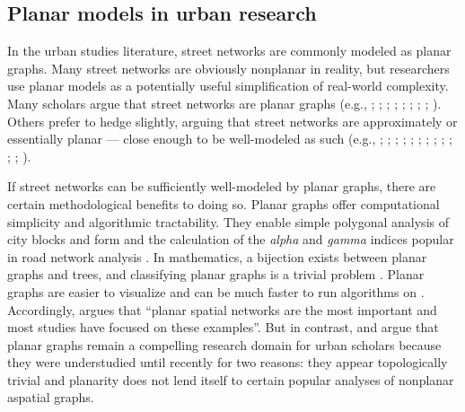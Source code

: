 \documentclass[Afour,sageh,times]{sagej}
\begin{document}
\subsection{Planar models in urban research}

In the urban studies literature, street networks are commonly modeled as planar graphs. Many street networks are obviously nonplanar in reality, but researchers use planar models as a potentially useful simplification of real-world complexity. Many scholars argue that street networks are planar graphs (e.g., \citealp[p.~18]{batty_network_2005}; \citealp[p.~521]{buhl_topological_2006}; \citealp[p.~1]{hu_topological_2008}; \citealp[p.~259]{masucci_random_2009}; \citealp[p.~114]{porta_networks_2010}; \citealp[p.~3]{strano_elementary_2012}; \citealp[p.~1]{masucci_limited_2013}; \citealp[p.~1074]{strano_urban_2013}; \citealp[p.~168]{law_defining_2017}). Others prefer to hedge slightly, arguing that street networks are approximately or essentially planar --- close enough to be well-modeled as such (e.g., \citealp[p.~6]{dill_measuring_2004}; \citealp[p.~3]{cardillo_structural_2006};  \citealp[p.~340]{xie_measuring_2007}; \citealp[p.~1]{barthelemy_modeling_2008}; \citealp[p.~3]{barthelemy_spatial_2011}; \citealp[pp.~563]{chan_urban_2011}; \citealp[p.~1]{gudmundsson_entropy_2013}; \citealp[p.~1]{viana_simplicity_2013}; \citealp[p.~2]{louf_typology_2014}; \citealp[p.~2191]{zhong_detecting_2014}; \citealp[p.~2]{wang_resilience_2015}; \citealp[p.~42]{aldous_routed_2016}; \citealp[p.~257]{barthelemy_paths_2017}).

If street networks can be sufficiently well-modeled by planar graphs, there are certain methodological benefits to doing so. Planar graphs offer computational simplicity and algorithmic tractability. They enable simple polygonal analysis of city blocks and form \citep{fohl_non-planar_1996,barthelemy_paths_2017} and the calculation of the \emph{alpha} and \emph{gamma} indices popular in road network analysis \citep{eppstein_studying_2008}. In mathematics, a bijection exists between planar graphs and trees, and classifying planar graphs is a trivial problem \citep{louf_typology_2014}. Planar graphs are easier to visualize and can be much faster to run algorithms on \citep{liebers_planarizing_2001}. Accordingly, \citet[p.~3]{barthelemy_spatial_2011} argues that \enquote{planar spatial networks are the most important and most studies have focused on these examples}. But in contrast, \citet{masucci_random_2009} and \citet{masucci_limited_2013} argue that planar graphs remain a compelling research domain for urban scholars because they were understudied until recently for two reasons: they appear topologically trivial and planarity does not lend itself to certain popular analyses of nonplanar aspatial graphs.
\end{document}

